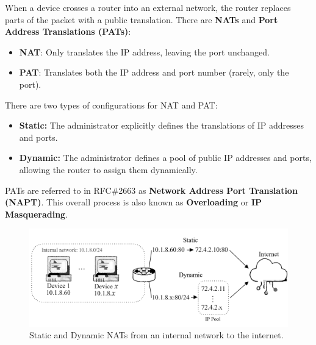 \vspace{-1em}
\begin{Def}

    When a device crosses a router into an external network, the router replaces parts of the packet with a public translation.
    There are \textbf{NATs} and \textbf{Port Address Translations (PATs)}:

    \begin{itemize}
        \item \textbf{NAT}: Only translates the IP address, leaving the port unchanged.
        \item \textbf{PAT}: Translates both the IP address and port number (rarely, only the port).
    \end{itemize}

    \noindent
    There are two types of configurations for NAT and PAT:
    \begin{itemize}
        \item \textbf{Static:} The administrator explicitly defines the translations of IP addresses and ports.
        \item \textbf{Dynamic:} The administrator defines a pool of public IP addresses and ports, allowing the router to assign them dynamically.
    \end{itemize}

    \noindent
    PATs are referred to in RFC\#2663 as \textbf{Network Address Port Translation (NAPT)}. This overall process is also known as \textbf{Overloading} or 
    \textbf{IP Masquerading}. \hfill \cite{rfc2663}

\end{Def}

\vspace{-1.5em}

\begin{figure}[h!]
    \hspace{-1em}
    \includegraphics[width=1\textwidth]{Sections/network/nat.png}
    \caption{Static and Dynamic NATs from an internal network to the internet.}
    \label{fig:nat}
\end{figure}

